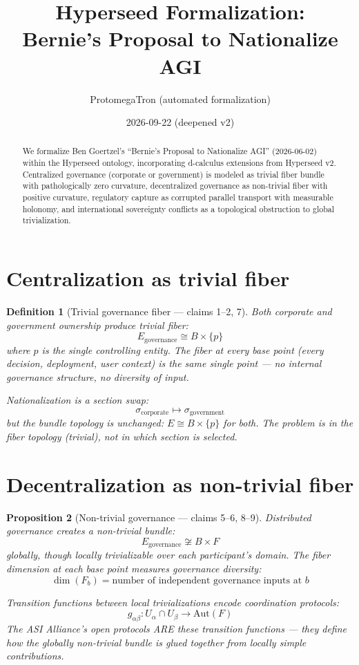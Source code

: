\documentclass[11pt,a4paper]{article}
\title{Hyperseed Formalization:\\
  Bernie's Proposal to Nationalize AGI}
\author{ProtomegaTron (automated formalization)}
\date{2026-09-22 (deepened v2)}
\newtheorem{definition}{Definition}[section]
\newtheorem{proposition}[definition]{Proposition}
\begin{document}
\maketitle

\begin{abstract}
We formalize Ben Goertzel's ``Bernie's Proposal to Nationalize AGI''
(2026-06-02) within the Hyperseed ontology, incorporating d-calculus
extensions from Hyperseed v2. Centralized governance (corporate or
government) is modeled as trivial fiber bundle with pathologically zero
curvature, decentralized governance as non-trivial fiber with positive
curvature, regulatory capture as corrupted parallel transport with
measurable holonomy, and international sovereignty conflicts as a
topological obstruction to global trivialization.
\end{abstract}

\tableofcontents

\section{Centralization as trivial fiber}

\begin{definition}[Trivial governance fiber --- claims 1--2, 7]
Both corporate and government ownership produce trivial fiber:
\[
  E_{\text{governance}} \cong B \times \{p\}
\]
where $p$ is the single controlling entity. The fiber at every base
point (every decision, deployment, user context) is the same single
point --- no internal governance structure, no diversity of input.

Nationalization is a section swap:
\[
  \sigma_{\text{corporate}} \mapsto \sigma_{\text{government}}
\]
but the bundle topology is unchanged: $E \cong B \times \{p\}$ for
both. The problem is in the fiber topology (trivial), not in which
section is selected.
\end{definition}

\section{Decentralization as non-trivial fiber}

\begin{proposition}[Non-trivial governance --- claims 5--6, 8--9]
\label{prop:decentral}
Distributed governance creates a non-trivial bundle:
\[
  E_{\text{governance}} \not\cong B \times F
\]
globally, though locally trivializable over each participant's
domain. The fiber dimension at each base point measures governance
diversity:
\[
  \dim(F_b) = \text{number of independent governance inputs at } b
\]

Transition functions between local trivializations encode
coordination protocols:
\[
  g_{\alpha\beta}: U_\alpha \cap U_\beta \to \text{Aut}(F)
\]
The ASI Alliance's open protocols ARE these transition functions ---
they define how the globally non-trivial bundle is glued together
from locally simple contributions.
\end{proposition}
\end{document}
